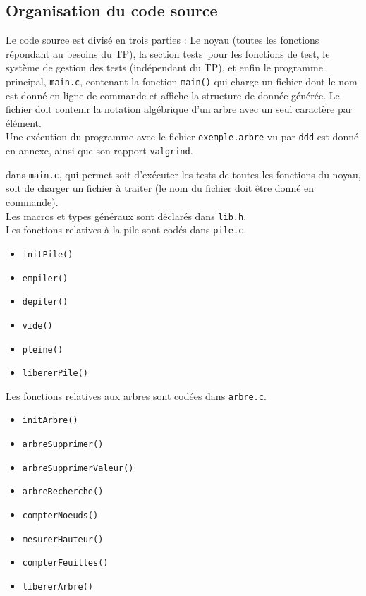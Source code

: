 \documentclass[a4paper,11pt] {article}
\begin{document}
\subsection{Organisation du code source}

Le code source est divisé en trois parties : Le noyau (toutes les fonctions répondant au besoins du TP), la section \og tests\fg\ pour les fonctions de test, le système de gestion des tests (indépendant du TP), et enfin le programme principal, \verb#main.c#, contenant la fonction \verb#main()# qui charge un fichier dont le nom est donné en ligne de commande et affiche la structure de donnée générée. Le fichier doit contenir la notation algébrique d'un arbre avec un seul caractère par élément.\\

Une exécution du programme avec le fichier \verb#exemple.arbre# vu par \verb?ddd? est donné en annexe, ainsi que son rapport \verb?valgrind?.

dans \verb#main.c#, qui permet soit d'exécuter les tests de toutes les fonctions du noyau, soit de charger un fichier à traiter (le nom du fichier doit être donné en commande).\\

Les macros et types généraux sont déclarés dans \verb#lib.h#.\\

Les fonctions relatives à la pile sont codés dans \verb#pile.c#.

\vspace{0.5cm}

\begin{itemize}
	\item \verb#initPile()#
	\item \verb#empiler()#
	\item \verb#depiler()#
	\item \verb#vide()#
	\item \verb#pleine()#
	\item \verb#libererPile()#
\end{itemize}

\vspace{0.5cm}

Les fonctions relatives aux arbres sont codées dans \verb#arbre.c#.

\vspace{0.5cm}

\begin{itemize}
    \item \verb#initArbre()#
    \item \verb#arbreSupprimer()#
    \item \verb#arbreSupprimerValeur()#
    \item \verb#arbreRecherche()#
    \item \verb#compterNoeuds()#
    \item \verb#mesurerHauteur()#
    \item \verb#compterFeuilles()#
    \item \verb#libererArbre()#
\end{itemize}
\end{document}
